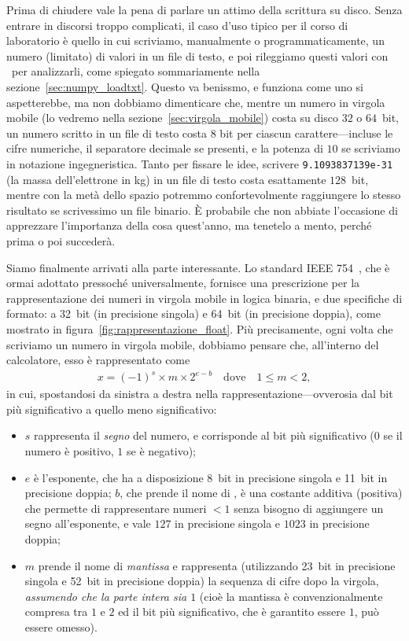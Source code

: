 Prima di chiudere vale la pena di parlare un attimo della scrittura su disco. Senza
entrare in discorsi troppo complicati, il caso d'uso tipico per il corso di laboratorio
\`e quello in cui scriviamo, manualmente o programmaticamente, un numero (limitato)
di valori in un file di testo, e poi rileggiamo questi valori con \numpy\ per
analizzarli, come spiegato sommariamente nella sezione~\ref{sec:numpy_loadtxt}.
Questo va benissmo, e funziona come uno si aspetterebbe, ma non dobbiamo dimenticare
che, mentre un numero in virgola mobile (lo vedremo nella sezione~\ref{sec:virgola_mobile})
costa su disco $32$ o $64$~bit, un numero scritto in un file di testo costa $8$
bit per ciascun carattere---incluse le cifre numeriche, il separatore decimale se
presenti, e la potenza di $10$ se scriviamo in notazione ingegneristica. Tanto per
fissare le idee, scrivere \texttt{9.1093837139e-31} (la massa dell'elettrone in kg)
in un file di testo costa esattamente $128$~bit, mentre con la met\`a dello spazio
potremmo confortevolmente raggiungere lo stesso risultato se scrivessimo un file
binario. \`E probabile che non abbiate l'occasione di apprezzare l'importanza della
cosa quest'anno, ma tenetelo a mento, perch\'e prima o poi succeder\`a.




Siamo finalmente arrivati alla parte interessante. Lo standard IEEE 754~\cite{ieee_754},
che è ormai adottato pressoché universalmente, fornisce una prescrizione
per la rappresentazione dei numeri in virgola mobile in logica binaria, e
due specifiche di formato: a 32~bit (in precisione singola) e 64~bit (in
precisione doppia), come mostrato in figura~\ref{fig:rappresentazione_float}.
Più precisamente, ogni volta che scriviamo un numero in virgola mobile, dobbiamo
pensare che, all'interno del calcolatore, esso è rappresentato come
\begin{align}\label{eq:ieee_754}
  x = (-1)^s \times m \times 2^{e - b} \quad \text{dove} \quad 1 \leq m < 2,
\end{align}
in cui, spostandosi da sinistra a destra nella rappresentazione---ovverosia dal
bit più significativo a quello meno significativo:
\begin{itemize}
  \item $s$ rappresenta il \emph{segno} del numero, e corrisponde al bit
    più significativo ($0$ se il numero è positivo, $1$ se è negativo);
  \item $e$ è l'esponente, che ha a disposizione 8~bit in precisione singola
    e 11~bit in precisione doppia; $b$, che prende il nome di ,
    è una costante additiva (positiva) che permette di rappresentare numeri
    $< 1$ senza bisogno di aggiungere un segno all'esponente, e vale $127$ in
    precisione singola e $1023$ in precisione doppia;
  \item $m$ prende il nome di \emph{mantissa} e rappresenta (utilizzando 23~bit in
    precisione singola e 52~bit in precisione doppia) la sequenza di cifre dopo
    la virgola, \emph{assumendo che la parte intera sia $1$} (cioè la mantissa
    è convenzionalmente compresa tra $1$ e $2$ ed il bit più significativo,
    che è garantito essere $1$, può essere omesso).
\end{itemize}

